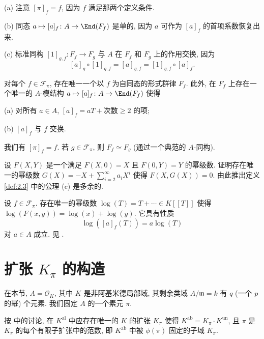 \begin{remark}\label{rem:2.19}
(a) 注意 $[\pi]_f=f$, 因为 $f$ 满足那两个定义条件.

(b) 同态 $a\mapsto[a]_f\colon A\to\End(F_f)$ 是单的, 因为 $a$ 可作为 $[a]_f$ 的首项系数恢复出来.

(c) 标准同构 $[1]_{g,f}\colon F_f\to F_g$ 与 $A$ 在 $F_f$ 和 $F_g$ 上的作用交换, 因为
\[
[a]_g\circ[1]_{g,f}=[a]_{g,f}=[1]_{g,f}\circ[a]_f.
\]
\end{remark}

\begin{summary}\label{note:2.20}
对每个 $f\in\mathcal{F}_{\pi}$, 存在唯一一个以 $f$ 为自同态的形式群律 $F_f$. 此外, 在 $F_f$ 上存在一个唯一的 $A$-模结构 $a\mapsto[a]_f\colon A\to\End(F_f)$ 使得

(a) 对所有 $a\in A$, $[a]_f=aT+\text{次数}\ge 2\text{ 的项}$;

(b) $[a]_f$ 与 $f$ 交换.

我们有 $[\pi]_f=f$. 若 $g\in\mathcal{F}_{\pi}$, 则 $F_f\simeq F_g$ (通过一个典范的 $A$-同构).
\end{summary}

\begin{exercise}\label{ex:2.21}
设 $F(X,Y)$ 是一个满足 $F(X,0)=X$ 且 $F(0,Y)=Y$ 的幂级数. 证明存在唯一的幂级数 $G(X)=-X+\sum_{i=2}^{\infty}a_i X^i$ 使得 $F(X,G(X))=0$. 由此推出定义\ref{def:2.3} 中的公理 (c) 是多余的.
\end{exercise}

\begin{NOTES}\label{note:2.22}
设 $f\in\mathcal{F}_{\pi}$. 存在唯一的幂级数 $\log(T)=T+\cdots\in K[[T]]$ 使得 $\log(F(x,y))=\log(x)+\log(y)$. 它具有性质
\[
\log([a]_f(T))=a\log(T)
\]
对 $a\in A$ 成立. 见 .
\end{NOTES}

\section{扩张 \texorpdfstring{$K_{\pi}$}{K pi} 的构造}\label{sec:I.3}

在本节, $A=\mathcal{O}_K$, 其中 $K$ 是非阿基米德局部域, 其剩余类域 $A/\mathfrak{m}=k$ 有 $q$ (一个 $p$ 的幂) 个元素. 我们固定 $A$ 的一个素元 $\pi$.

按  中的讨论, 在 $K^{\mathrm{al}}$ 中应存在唯一的 $K$ 的扩张 $K_{\pi}$ 使得 $K^{\mathrm{ab}}=K_{\pi}\cdot K^{\mathrm{un}}$, 且 $\pi$ 是 $K_{\pi}$ 的每个有限子扩张中的范数, 即 $K^{\mathrm{ab}}$ 中被 $\phi(\pi)$ 固定的子域 $K_{\pi}$.

